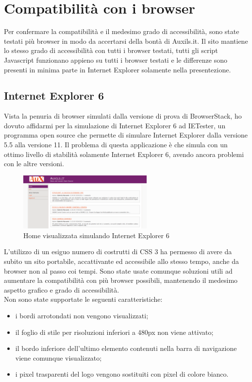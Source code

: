 \section{Compatibilità con i browser}
Per confermare la compatibilità e il medesimo grado di accessibilità, sono state testati più browser in modo da accertarsi della bontà di Auxils.it. Il sito mantiene lo stesso grado di accessibilità con tutti i browser testati, tutti gli script Javascript funzionano appieno su tutti i browser testati e le differenze sono presenti in minima parte in Internet Explorer solamente nella presentezione.\\
\subsection{Internet Explorer 6}
Vista la penuria di browser simulati dalla versione di prova di BrowserStack, ho dovuto affidarmi per la simulazione di Internet Explorer 6 ad IETester, un programma open source che permette di simulare Internet Explorer dalla versione 5.5 alla versione 11. Il problema di questa applicazione è che simula con un ottimo livello di stabilità solamente Internet Explorer 6, avendo ancora problemi con le altre versioni.\\
\begin{figure}[H]
  \centering \includegraphics[width=0.6\textwidth]{images/homeie6.png}
  \caption{Home visualizzata simulando Internet Explorer 6}
\end{figure}
L'utilizzo di un esiguo numero di costrutti di CSS 3 ha permesso di avere da subito un sito portabile, accattivante ed accessibile allo stesso tempo, anche da browser non al passo coi tempi. Sono state usate comunque soluzioni utili ad aumentare la compatibilità con più browser possibili, mantenendo il medesimo aspetto grafico e grado di accessibilità.\\
Non sono state supportate le seguenti caratteristiche:
\begin{itemize}
  \item i bordi arrotondati non vengono visualizzati;
  \item il foglio di stile per risoluzioni inferiori a 480px non viene attivato;
  \item il bordo inferiore dell'ultimo elemento contenuti nella barra di navigazione viene comunque visualizzato;
  \item i pixel trasparenti del logo vengono sostituiti con pixel di colore bianco.
\end{itemize}
